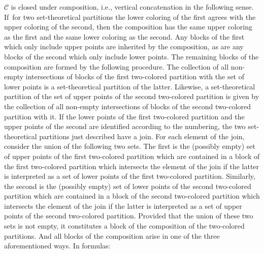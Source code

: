 \documentclass[10pt,a4paper]{amsart}
\numberwithin{equation}{section}
\newcommand{\Yc}[1]{\mathfrak{#1}}
\newcommand{\Yb}[1]{\mathsf{#1}}
\newcommand{\thecat}{\mathcal{C}}
\begin{document}
\begin{Definition}
\begin{enumerate}
{\begin{enumerate}
{            \newcommand{\outcol}{\Yc{e}}
          \newcommand{\firstpartition}{p}
          \newcommand{\secondpartition}{q}
          \newcommand{\midsup}{s}
          \newcommand{\inblock}{\Yb{A}}
          \newcommand{\midblock}{B}
          \newcommand{\outblock}{\Yb{C}}
          \newcommand{\inind}{i}
          \newcommand{\outind}{j}
          $\thecat$ is closed under composition, i.e., vertical concatenation in the following sense. If~for two set-theoretical partitions   the lower coloring of the first agrees with the upper coloring of the second, then the composition has the same upper coloring as the first and the same lower coloring as the second. Any blocks of the first which only include upper points are inherited by the composition, as are any blocks of the second which only include lower points. The remaining blocks of the composition are formed by the following procedure. The collection of all non-empty intersections of  blocks of the first two-colored partition  with the set of lower points is a set-theoretical partition of the latter. Likewise, a set-theoretical partition of the set of upper points of the second two-colored partition is given by the collection of all non-empty intersections of blocks of the second two-colored partition with it.  If the lower points of the first two-colored partition and the upper points of the second are identified according to the numbering, the two set-theoretical partitions just described have a join. For each element of the join, consider the union  of the following two sets. The first is the (possibly empty) set of upper points of the first two-colored partition which are contained in a block of the first two-colored partition which intersects the element of the join if the latter is interpreted as a set of lower points of the first two-colored partition. Similarly, the second is the (possibly empty) set of lower points of the second two-colored partition which are contained in a block of the second two-colored partition which intersects the element of the join if the latter is interpreted as a set of upper points of the second two-colored partition. Provided that the union of these two sets is not empty, it constitutes a block of the composition of the two-colored partitions. And all blocks of the composition arise in one of the three aforementioned ways.
          In formulas:
}
\end{enumerate}}
\end{enumerate}
\end{Definition}
\end{document}
